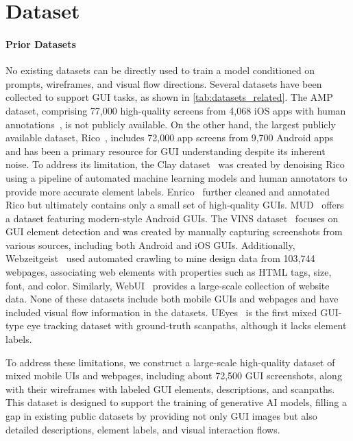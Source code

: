 

\section{Dataset}

\paragraph{Prior Datasets}
No existing datasets can be directly used to train a model conditioned on prompts, wireframes, and visual flow directions. 
Several datasets have been collected to support GUI tasks, as shown in \autoref{tab:datasets_related}. The AMP dataset, comprising 77,000 high-quality screens from 4,068 iOS apps with human annotations~\cite{zhang2021screen}, is not publicly available. On the other hand, the largest publicly available dataset, Rico~\cite{rico}, includes 72,000 app screens from 9,700 Android apps and has been a primary resource for GUI understanding despite its inherent noise. To address its limitation, the Clay dataset~\cite{li2022learning} was created by denoising Rico using a pipeline of automated machine learning models and human annotators to provide more accurate element labels. Enrico~\cite{enrico} further cleaned and annotated Rico but ultimately contains only a small set of high-quality GUIs. MUD~\cite{mud} offers a dataset featuring modern-style Android GUIs. The VINS dataset~\cite{vins} focuses on GUI element detection and was created by manually capturing screenshots from various sources, including both Android and iOS GUIs. Additionally, Webzeitgeist~\cite{kumar2013webzeitgeist} used automated crawling to mine design data from 103,744 webpages, associating web elements with properties such as HTML tags, size, font, and color. Similarly, WebUI~\cite{webui} provides a large-scale collection of website data. None of these datasets include both mobile GUIs and webpages and have included visual flow information in the datasets.
UEyes~\cite{ueyes} is the first mixed GUI-type eye tracking dataset with ground-truth scanpaths, although it lacks element labels.

To address these limitations, we construct a large-scale high-quality dataset of mixed mobile UIs and webpages, including about 72,500 GUI screenshots, along with their wireframes with labeled GUI elements, descriptions, and scanpaths. This dataset is designed to support the training of generative AI models, filling a gap in existing public datasets by providing not only GUI images but also detailed descriptions, element labels, and visual interaction flows. 

